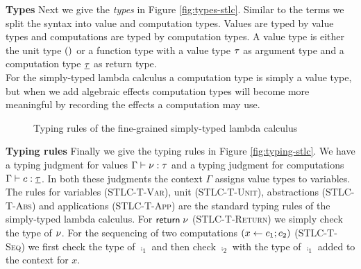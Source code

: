 {\textbf{Types}
Next we give the \emph{types} in Figure \ref{fig:types-stlc}.
Similar to the terms we split the syntax into value and computation types.
Values are typed by value types and computations are typed by computation types.
A value type is either the unit type $()$ or a function type with a value type $\tau$ as argument type and a computation type  $\underline{\tau}$ as return type.\\
For the simply-typed lambda calculus a computation type is simply a value type, but when we add algebraic effects computation types will become more meaningful by recording the effects a computation may use.

\begin{figure}
\caption{Typing rules of the fine-grained simply-typed lambda calculus}
\centering
{}
\end{figure}

\textbf{Typing rules}
Finally we give the typing rules in Figure \ref{fig:typing-stlc}.
We have a typing judgment for values $\Gamma \vdash \nu : \tau$ and a typing judgment for computations $\Gamma \vdash c : \underline{\tau}$.
In both these judgments the context $\Gamma$ assigns value types to variables.\\
The rules for variables ({\footnotesize\textsc{STLC-T-Var}}), unit ({\footnotesize\textsc{STLC-T-Unit}}), abstractions ({\footnotesize\textsc{STLC-T-Abs}}) and applications ({\footnotesize\textsc{STLC-T-App}}) are the standard typing rules of the simply-typed lambda calculus.
For $\mathsf{return} \; \nu$ ({\footnotesize\textsc{STLC-T-Return}}) we simply check the type of $\nu$.
For the sequencing of two computations $(x \leftarrow c_1 ; c_2)$ ({\footnotesize\textsc{STLC-T-Seq}}) we first check the type of $\comp_1$ and then check $\comp_2$ with the type of $\comp_1$ added to the context for $x$.

}
